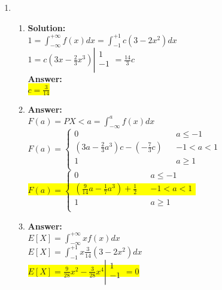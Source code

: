 \documentclass{article}
\newcommand{\myansw}{\textbf{Answer:}\\}
\newcommand{\mysolu}{\textbf{Solution:}\\}
\begin{document}
\begin{enumerate}
	\item
	\begin{enumerate}
		\item
		\mysolu
		${1 = \int_{-\infty}^{+\infty}f(x)dx=\int_{-1}^{+1}c(3-2x^2)dx}$\\
		$1 = c(3x-\frac{2}{3}x^3) \left| \begin{array}{rcl}
			1\\
			-1\\
			\end{array}
			\right. = \frac{14}{3}c$\\
		\myansw
		\colorbox{yellow}{${c = \frac{3}{14}}$}\\
		\item
		\myansw
		${F(a) = P{X < a} = \int_{-\infty}^{a}f(x)dx}$\\
		$F(a)=\left\lbrace \begin{array}{rcl}
		0 & &{a\leq -1}\\
		(3a-\frac{2}{3}a^3)c-(-\frac{7}{3}c) & &{-1<a<1}\\
		1 & & a\geq 1\\
		\end{array} \right.$\\
		\colorbox{yellow}{
			${F(a) = \left\lbrace \begin{array}{rcl}
				0 & &{a\leq -1}\\
				(\frac{9}{14}a-\frac{1}{7}a^3)+\frac{1}{2} & &{-1<a<1}\\
				1 & & a\geq 1\\
				\end{array} \right.}$
		}\\
		\item
		\myansw
		${E[X] = \int_{-\infty}^{+\infty}xf(x)dx}$\\
		${E[X] = \int_{-1}^{+1}x\frac{3}{14}(3 - 2x^2)dx}$\\
		\colorbox{yellow}{${E[X] = \frac{9}{28}x^2 - \frac{3}{28}x^4\left| \begin{array}{rcl}
			1\\
			-1\\
			\end{array}
			\right. = 0}$}\\
		

\end{enumerate}
\end{enumerate}
\end{document}
